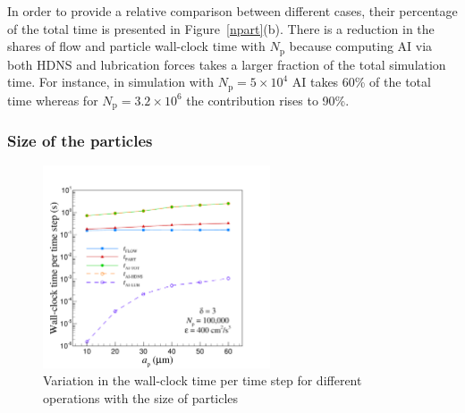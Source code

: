 \documentclass[../thesis.tex]{subfiles}
\begin{document}
In order to provide a relative comparison between different cases, their percentage of the total time is presented in Figure~\ref{npart}(b). There is a reduction in the shares of flow and particle wall-clock time with $N_\text{p}$ because computing AI via both HDNS and lubrication forces takes a larger fraction of the total simulation time. For instance, in simulation with \mbox{$N_\text{p}=5\times10^4$} AI takes 60\% of the total time whereas for \mbox{$N_\text{p}=3.2\times10^6$} the contribution rises to 90\%.


\subsubsection{Size of the particles}

\begin{figure}%
\center
\includegraphics[trim=5mm 0mm 20mm 15mm, clip, width=0.6\textwidth]{./figs/PPAM/4b/CP022_fig4b.pdf}
\caption{Variation in the wall-clock time per time step for different operations with the size of particles}
\label{apart}
\end{figure}%
\end{document}
